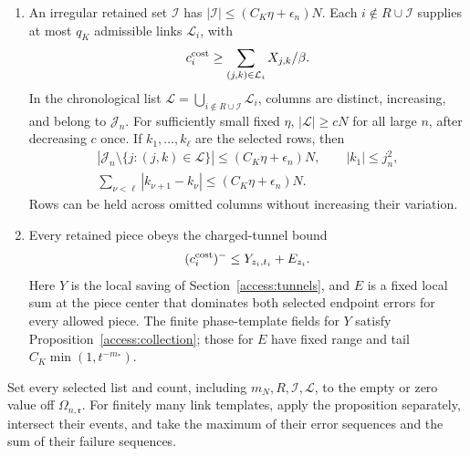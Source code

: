 \begin{proposition}
\begin{enumerate}
\item An irregular retained set \(\mathcal I\) has
\(|\mathcal I|\le(C_K\eta+\epsilon_n)N\). Each
\(i\notin R\cup\mathcal I\) supplies at most \(q_K\) admissible links
\(\mathcal L_i\), with
\begin{equation}
 c_i^{\rm cost}\ge\sum_{(j,k)\in\mathcal L_i}X_{j,k}/\beta.
 \label{links:unclipped-comparison}
\end{equation}
In the chronological list
\(\mathcal L=\bigcup_{i\notin R\cup\mathcal I}\mathcal L_i\), columns
are distinct, increasing, and belong to \(\mathcal J_n\). For
sufficiently small fixed \(\eta\), \(|\mathcal L|\ge cN\) for all
large \(n\), after decreasing \(c\) once. If \(k_1,\ldots,k_\ell\)
are the selected rows, then
\begin{equation}
 \begin{gathered}
 |\mathcal J_n\setminus\{j:(j,k)\in\mathcal L\}|
       \le(C_K\eta+\epsilon_n)N,\qquad |k_1|\le j_n^2,\\
 \sum_{\nu<\ell}|k_{\nu+1}-k_\nu|
       \le(C_K\eta+\epsilon_n)N.
 \end{gathered}
 \label{links:selected-rows}
\end{equation}
Rows can be held across omitted columns without increasing their variation.

\item Every retained piece obeys the charged-tunnel bound
\begin{equation}
 (c_i^{\rm cost})^-\le Y_{z_i,t_i}+E_{z_i}.
 \label{links:tunnel-bound}
\end{equation}
Here \(Y\) is the local saving of Section~\ref{access:tunnels}, and
\(E\) is a fixed local sum at the piece center that dominates both
selected endpoint errors for every allowed piece. The finite
phase-template fields for \(Y\) satisfy
Proposition~\ref{access:collection}; those for \(E\) have fixed range
and tail \(C_K\min(1,t^{-m_*})\).
\end{enumerate}
Set every selected list and count, including \(m_N,R,\mathcal I,\mathcal L\),
to the empty or zero value off \(\Omega_{n,\mathfrak r}\).
For finitely many link templates, apply the proposition separately,
intersect their events, and take the maximum of their error sequences
and the sum of their failure sequences.
\end{proposition}

